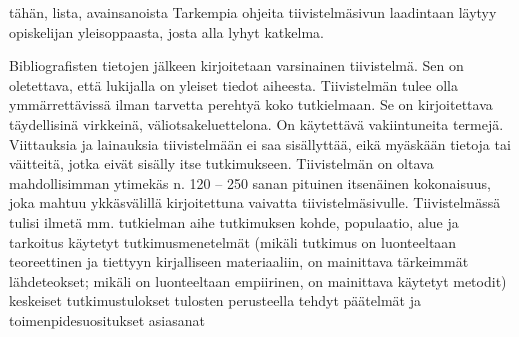\begin{ittiivis}{tähän, lista, avainsanoista}
Tarkempia ohjeita tiivistelmäsivun laadintaan läytyy opiskelijan
yleisoppaasta, josta alla lyhyt katkelma.

Bibliografisten tietojen jälkeen kirjoitetaan varsinainen tiivistelmä.
Sen on oletettava, että lukijalla on yleiset tiedot aiheesta.
Tiivistelmän tulee olla ymmärrettävissä ilman tarvetta perehtyä koko
tutkielmaan. Se on kirjoitettava täydellisinä virkkeinä,
väliotsakeluettelona. On käytettävä vakiintuneita termejä. Viittauksia
ja lainauksia tiivistelmään ei saa sisällyttää, eikä myäskään tietoja
tai väitteitä, jotka eivät sisälly itse tutkimukseen. Tiivistelmän on
oltava mahdollisimman ytimekäs n. 120 -- 250 sanan pituinen itsenäinen
kokonaisuus, joka mahtuu ykkäsvälillä kirjoitettuna vaivatta
tiivistelmäsivulle. Tiivistelmässä tulisi ilmetä mm.  tutkielman aihe
tutkimuksen kohde, populaatio, alue ja tarkoitus käytetyt
tutkimusmenetelmät (mikäli tutkimus on luonteeltaan teoreettinen ja
tiettyyn kirjalliseen materiaaliin, on mainittava tärkeimmät
lähdeteokset; mikäli on luonteeltaan empiirinen, on mainittava käytetyt
metodit) keskeiset tutkimustulokset tulosten perusteella tehdyt
päätelmät ja toimenpidesuositukset asiasanat
\end{ittiivis}

